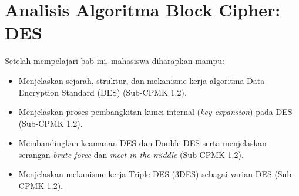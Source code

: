 \documentclass[../../main.tex]{subfiles}
\begin{document}
\chapter{Analisis Algoritma Block Cipher: DES}
\label{chap:des}

\begin{learningoutcome}
Setelah mempelajari bab ini, mahasiswa diharapkan mampu:
\begin{itemize}
    \item Menjelaskan sejarah, struktur, dan mekanisme kerja algoritma Data Encryption Standard (DES) (Sub-CPMK 1.2).
    \item Menjelaskan proses pembangkitan kunci internal (\textit{key expansion}) pada DES (Sub-CPMK 1.2).
    \item Membandingkan keamanan DES dan Double DES serta menjelaskan serangan \textit{brute force} dan \textit{meet-in-the-middle} (Sub-CPMK 1.2).
    \item Menjelaskan mekanisme kerja Triple DES (3DES) sebagai varian DES (Sub-CPMK 1.2).
\end{itemize}
\end{learningoutcome}









\end{document}
